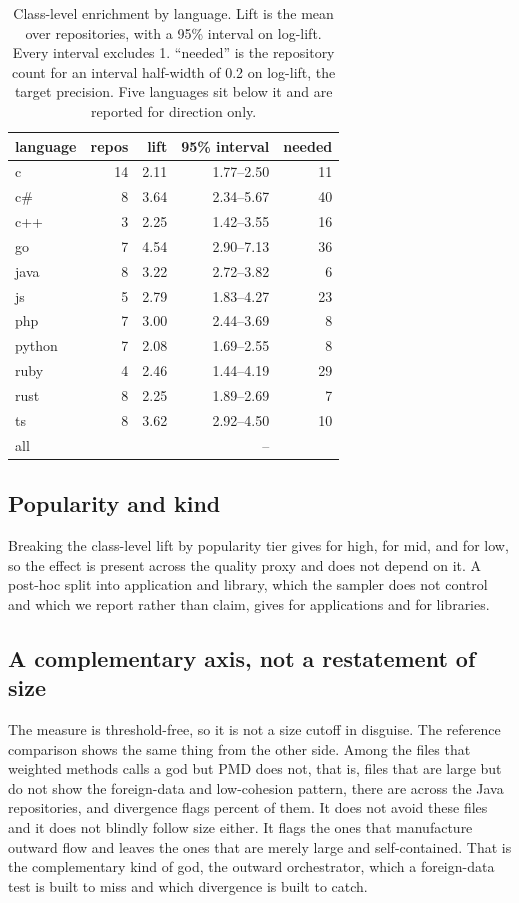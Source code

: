 \documentclass[11pt,a4paper]{article}
\begin{document}
\begin{table}[t]
\centering
\caption{Class-level enrichment by language. Lift is the mean over repositories,
with a 95\% interval on log-lift. Every interval excludes 1. ``needed'' is the
repository count for an interval half-width of 0.2 on log-lift, the target
precision. Five languages sit below it and are reported for direction only.}
\label{tab:bylang}
\begin{tabular}{lrrrr}
\toprule
language & repos & lift & 95\% interval & needed \\
\midrule
c       & 14 & 2.11 & 1.77--2.50 & 11 \\
c\#     &  8 & 3.64 & 2.34--5.67 & 40 \\
c++     &  3 & 2.25 & 1.42--3.55 & 16 \\
go      &  7 & 4.54 & 2.90--7.13 & 36 \\
java    &  8 & 3.22 & 2.72--3.82 &  6 \\
js      &  5 & 2.79 & 1.83--4.27 & 23 \\
php     &  7 & 3.00 & 2.44--3.69 &  8 \\
python  &  7 & 2.08 & 1.69--2.55 &  8 \\
ruby    &  4 & 2.46 & 1.44--4.19 & 29 \\
rust    &  8 & 2.25 & 1.89--2.69 &  7 \\
ts      &  8 & 3.62 & 2.92--4.50 & 10 \\
\midrule
all     & \classN{} & \classLift{} & \classLo{}--\classHi{} & \classNeed{} \\
\bottomrule
\end{tabular}
\end{table}

\subsection{Popularity and kind}
Breaking the class-level lift by popularity tier gives \tierHigh{} for high,
\tierMid{} for mid, and \tierLow{} for low, so the effect is present across the
quality proxy and does not depend on it. A post-hoc split into application and
library, which the sampler does not control and which we report rather than claim,
gives \kindApp{} for \nApp{} applications and \kindLib{} for \nLib{} libraries.

\subsection{A complementary axis, not a restatement of size}
The measure is threshold-free, so it is not a size cutoff in disguise. The
reference comparison shows the same thing from the other side. Among the files that
weighted methods calls a god but PMD does not, that is, files that are large but do
not show the foreign-data and low-cohesion pattern, there are \leafTotal{} across
the Java repositories, and divergence flags \leafFlagPct{} percent of them. It does
not avoid these files and it does not blindly follow size either. It flags the ones
that manufacture outward flow and leaves the ones that are merely large and
self-contained. That is the complementary kind of god, the outward orchestrator,
which a foreign-data test is built to miss and which divergence is built to catch.
\end{document}
